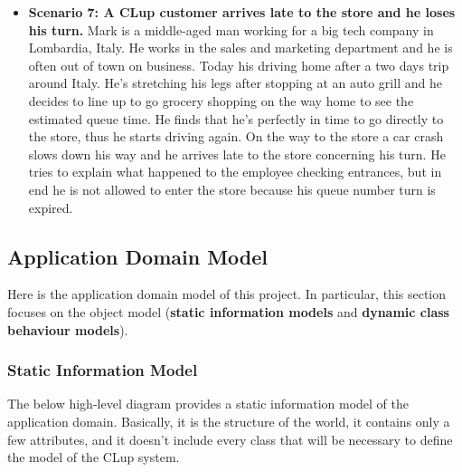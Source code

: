 \begin{itemize}
    \item \textbf{Scenario 7: A CLup customer arrives late to the store and he loses his turn.} Mark is a middle-aged man working for a big tech company in Lombardia, Italy. He works in the sales and marketing department and he is often out of town on business. Today his driving home after a two days trip around Italy. He's stretching his legs after stopping at an auto grill and he decides to line up to go grocery shopping on the way home to see the estimated queue time. He finds that he's perfectly in time to go directly to the store, thus he starts driving again. 
    On the way to the store a car crash slows down his way and he arrives late to the store concerning his turn. He tries to explain what happened to the employee checking entrances, but in end he is not allowed to enter the store because his queue number turn is expired.
\end{itemize}

\subsection{Application Domain Model}
Here is the application domain model of this project. In particular, this section focuses on the object model (\textbf{static information models} and \textbf{dynamic class behaviour models}).
\subsubsection{Static Information Model}
The below high-level diagram provides a static information model of the application domain. Basically, it is the structure of the world, it contains only a few attributes, and it doesn't include every class that will be necessary to define the model of the CLup system.


